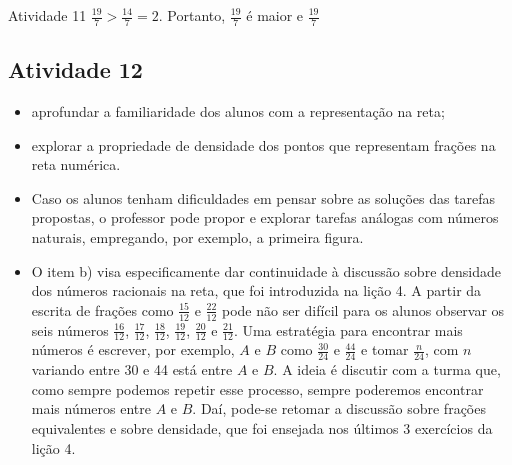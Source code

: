 \begin{multicols}{2}
\begin{resposta*}{Atividade 11}
$\frac{19}{7} > \frac{14}{7} = 2$. Portanto, $\frac{19}{7}$ é maior e $\frac{19}{7}$ 
\end{resposta*}


\subsection{Atividade 12}

  \newline \vspace{.15cm}  

  \begin{itemize} %
    \item       aprofundar a familiaridade dos alunos com a representação na reta;
    \item       explorar a propriedade de densidade dos pontos que representam frações na reta numérica.
  \end{itemize} %
  
  
   \vspace{.15cm}  

  \begin{itemize} %
    \item       Caso os alunos tenham dificuldades em pensar sobre as soluções das tarefas propostas, o professor pode propor e explorar tarefas análogas com números naturais, empregando, por exemplo, a primeira figura.
    \item O item b) visa especificamente dar continuidade à discussão sobre densidade dos números racionais na reta, que foi introduzida na lição 4. A partir da escrita de frações como $\frac{15}{12}$ e $\frac{22}{12}$       pode não ser difícil para os alunos observar os seis números       $\frac{16}{12}$,       $\frac{17}{12}$,       $\frac{18}{12}$,       $\frac{19}{12}$, $\frac{20}{12}$ e $\frac{21}{12}$. Uma estratégia para encontrar mais números é escrever, por exemplo,       $A$       e       $B$       como       $\frac{30}{24}$       e       $\frac{44}{24}$ e tomar       $\frac{n}{24}$, com       $n$       variando entre 30 e 44 está entre       $A$       e       $B$. A ideia é discutir com a turma que, como sempre podemos repetir esse processo, sempre poderemos encontrar mais números entre       $A$       e       $B$. Daí, pode-se retomar a discussão sobre frações equivalentes e sobre densidade, que foi ensejada nos últimos 3 exercícios da lição 4.
  \end{itemize} %
  

\end{multicols}
